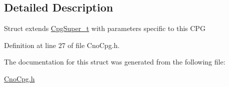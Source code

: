 \subsection{Detailed Description}
Struct extends \hyperlink{structCpgSuper__t}{CpgSuper\_\-t} with parameters specific to this CPG 

Definition at line 27 of file CnoCpg.h.



The documentation for this struct was generated from the following file:\begin{DoxyCompactItemize}
\item 
\hyperlink{CnoCpg_8h}{CnoCpg.h}\end{DoxyCompactItemize}
